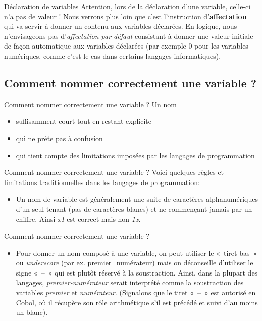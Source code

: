 \begin{frame}{Déclaration de variables}
	Attention, lors de la déclaration d’une variable, celle-ci n’a pas de
	valeur ! Nous verrons plus loin que c’est l’instruction
	d’\textbf{affectation} qui va servir à donner un contenu aux variables
	déclarées. En logique, nous n’envisageons pas d’\textit{affectation par
	défaut} consistant à donner une valeur initiale de façon automatique
	aux variables déclarées (par exemple 0 pour les variables numériques,
	comme c’est le cas dans certains langages informatiques).
\end{frame}

\subsection{Comment nommer correctement une variable ?}

\begin{frame}{Comment nommer correctement une variable ?}
	Un nom 
	\begin{itemize}
		\item suffisamment court tout en restant explicite
		\item qui ne prête pas à confusion
		\item qui tient compte des limitations imposées par les
			langages de programmation
	\end{itemize}
\end{frame}

\begin{frame}{Comment nommer correctement une variable ?}
	Voici quelques règles et limitations traditionnelles dans les langages
	de programmation:

	\begin{itemize}
	\item 
		Un nom de variable est généralement une suite de caractères
		alphanumériques d’un seul tenant (pas de caractères blancs) et ne
		commençant jamais par un chiffre. Ainsi \textit{x1} est
		correct mais non \textit{1x}. 
	\end{itemize}
\end{frame}

\begin{frame}{Comment nommer correctement une variable ?}
	\begin{itemize}
	\item 
		Pour donner un nom composé à une variable, on peut utiliser le «~tiret
		bas~» ou \textit{underscore} (par ex. premier\_numérateur) mais on
		déconseille d’utiliser le signe «~–~» qui est plutôt réservé à la
		soustraction. Ainsi, dans la plupart des langages,
		\textit{premier-numérateur} serait interprété comme la
		soustraction des variables \textit{premier} et
		\textit{numérateur}. (Signalons que le tiret 
		\textcolor{black}{«~–~»} est autorisé en Cobol, où il récupère son rôle
		arithmétique s’il est précédé et suivi d’au moins un blanc).
	\end{itemize}
\end{frame}

